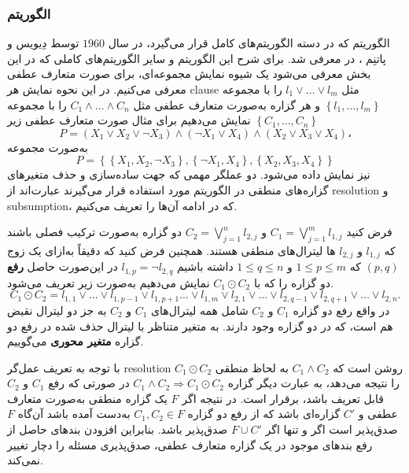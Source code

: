 \subsubsection*{الگوریتم }
الگوریتم 
که  در دسته الگوریتم‌های کامل قرار می‌گیرد، در سال 
$1960$
توسط دِیویس
 و پاتنِم 
 ، 
  در 
\cite{davis1960computing}
معرفی شد.  برای شرح این الگوریتم و سایر الگوریتم‌های کاملی که در این بخش معرفی می‌شود یک شیوه نمایش مجموعه‌ای، برای صورت متعارف عطفی  معرفی می‌کنیم.  در این نحوه نمایش هر 
\gls*{clause}
مثل 
$l_{1}\vee\ldots\vee l_{m}$
را با مجموعه 
$\left\{l_{1},\ldots, l_{m}\right\}$
و هر گزاره به‌صورت متعارف عطفی مثل 
$C_{1}\wedge\ldots\wedge C_{n}$
را با مجموعه 
$\left\{C_{1},\ldots, C_{n}\right\}$
نمایش می‌دهیم برای مثال صورت متعارف عطفی  زیر 
\begin{equation*}
P = (X_{1}\vee X_{2}\vee \neg X_{3})\wedge (\neg X_{1}\vee X_{4})\wedge (X_{2}\vee X_{3}\vee X_{4})، 
\end{equation*}
به‌صورت مجموعه 
\begin{equation*}
P = \left\{\left\{X_{1}, X_{2}, \neg X_{3}\right\},\left\{\neg X_{1}, X_{4}\right\},\left\{X_{2}, X_{3}, X_{4}\right\}\right\}
\end{equation*}
نیز نمایش داده می‌شود.  دو عملگر مهمی که جهت ساده‌سازی و حذف متغیرهای گزاره‌های منطقی  در الگوریتم 
مورد استفاده قرار می‌گیرند عبارت‌اند از 
\gls*{resolution}
و 
\gls*{subsumption}، 
که در ادامه آن‌ها را تعریف می‌کنیم. 
\begin{definition}
	فرض کنید 
$C_{1} = \bigvee_{j = 1}^{m}l_{1,j}$
و 
$C_{2} = \bigvee_{j = 1}^{n}l_{2,j}$
دو گزاره به‌صورت ترکیب فصلی باشند که 
$l_{1,j}$
و 
$l_{2,j}$
ها لیترال‌های منطقی هستند. همچنین فرض کنید که دقیقاً به‌ازای یک زوج 
$(p, q)$
که 
$1\leq p\leq m$
و 
$1\leq q\leq n$
داشته باشیم 
$l_{1,p} = \neg l_{2,q}$
در این‌صورت حاصل 
\textbf{رفع}
دو گزاره  را که با 
$C_{1}\odot C_{2}$
نمایش می‌دهیم به‌صورت زیر تعریف می‌شود. 
\begin{equation*}
C_{1}\odot C_{2} = l_{1,1}\vee \ldots\vee l_{1,p-1}\vee l_{1,p+1}\ldots\vee l_{1,m}\vee l_{2, 1}\vee \ldots\vee l_{2,q-1}\vee l_{2, q+1}\vee \ldots\vee l_{2, n}. 
\end{equation*}
  در واقع رفع دو گزاره 
$C_{1}$
و 
$C_{2}$
شامل همه‌ لیترال‌های 
$C_{1}$
و 
$C_{2}$
به جز دو لیترال  نقیض هم است، که در دو گزاره وجود دارند. به متغیر متناظر با لیترال حذف شده در رفع دو گزاره 
\textbf{متغیر محوری}
می‌گوییم.
\end{definition}
با توجه به تعریف عمل‌گر  
\gls{resolution}
روشن است که 
$C_{1}\wedge C_{2}$
به لحاظ منطقی 
$C_{1}\odot C_{2}$
را نتیجه می‌دهد، به عبارت دیگر گزاره 
$C_{1}\wedge C_{2}\Rightarrow C_{1}\odot C_{2}$
در صورتی که رفع 
$C_{1}$
و 
$C_{2}$
قابل تعریف باشد، برقرار است. در نتیجه اگر 
$F$
یک گزاره منطقی به‌صورت متعارف عطفی و 
$C'$
گزاره‌ای باشد که از رفع دو گزاره 
$C_{1}, C_{2}\in F$
به‌دست آمده باشد آن‌گاه 
$F$
صدق‌پذیر است اگر و تنها اگر 
$F\cup C'$
صدق‌پذیر باشد.  بنابراین افزودن بندهای حاصل از رفع بند‌های موجود در یک گزاره متعارف عطفی، صدق‌پذیری مسئله را دچار تغییر نمی‌کند. 

